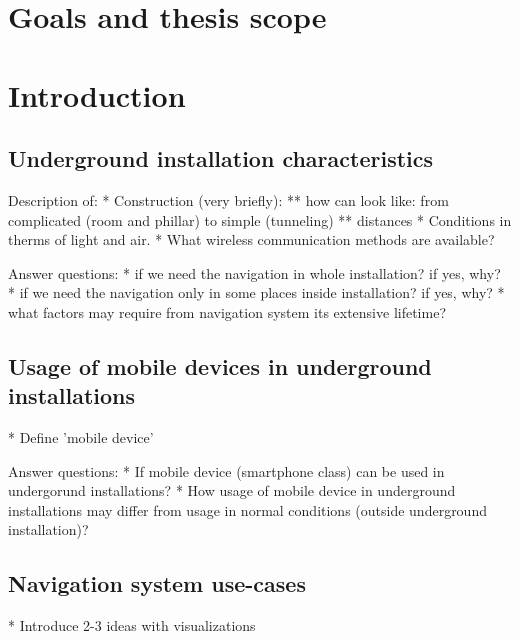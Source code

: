\documentclass[../main.tex]{subfiles}
\begin{document}
\chapter{Goals and thesis scope}



\chapter{Introduction}

\section{Underground installation characteristics}

Description of:
* Construction (very briefly):
** how can look like: from complicated (room and phillar) to simple (tunneling)
** distances
* Conditions in therms of light and air.
* What wireless communication methods are available?

Answer questions:
* if we need the navigation in whole installation? if yes, why?
* if we need the navigation only in some places inside installation? if yes, why?
* what factors may require from navigation system its extensive lifetime?

\section{Usage of mobile devices in underground installations}
* Define 'mobile device'

Answer questions:
* If mobile device (smartphone class) can be used in undergorund installations?
* How usage of mobile device in underground installations may differ from usage in normal conditions (outside underground installation)?

\section{Navigation system use-cases}
* Introduce 2-3 ideas with visualizations
\end{document}

